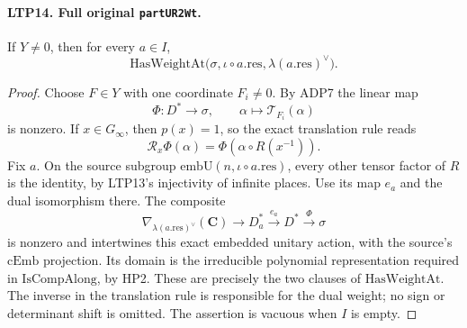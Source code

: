 \paragraph{LTP14. Full original \texttt{partUR2Wt}.}
\label{claim:LTP14}
If \(Y\ne0\), then for every \(a\in I\),
\[
   \mathrm{HasWeightAt}
       \bigl(\sigma,\iota\circ a.\mathrm{res},
                         \lambda(a.\mathrm{res})^\vee\bigr).
\]
\begin{proof}
Choose \(F\in Y\) with one coordinate \(F_i\ne0\).  By ADP7
the linear map
\[
                 \Phi:D^*\longrightarrow\sigma,\qquad
                        \alpha\longmapsto\mathcal T_{F_i}(\alpha)
\]
is nonzero.  If \(x\in G_\infty\), then \(p(x)=1\), so the
exact translation rule reads
\[
       \mathscr R_x\Phi(\alpha)
                         =\Phi(\alpha\circ R(x^{-1})).
\]
Fix \(a\).  On the source subgroup
\(\mathrm{embU}(n,\iota\circ a.\mathrm{res})\), every other
tensor factor of \(R\) is the identity, by LTP13's injectivity
of infinite places.  Use its map \(e_a\) and the dual
isomorphism there.  The composite
\[
 \nabla_{\lambda(a.\mathrm{res})^\vee}(\mathbf C)
       \longrightarrow D_a^*
       \xrightarrow{e_a}D^*
       \xrightarrow{\Phi}\sigma
\]
is nonzero and intertwines this exact embedded unitary action,
with the source's \(\mathrm{cEmb}\) projection.
Its domain is the irreducible polynomial representation
required in \(\mathrm{IsCompAlong}\), by HP2.
These are precisely the two clauses of
\(\mathrm{HasWeightAt}\).  The inverse in the translation rule
is responsible for the dual weight; no sign or determinant shift
is omitted.  The assertion is vacuous when \(I\) is empty.
\end{proof}

